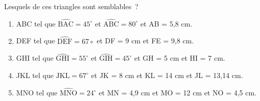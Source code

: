 \documentclass[exercice]{thedocument}%
\begin{document}
%
Lesquels de ces triangles sont semblables~?
\begin{enumerate}
    \item ABC tel que $\widehat{\text{BAC}}=45^\circ$ et $\widehat{\text{ABC}}=80^\circ$ et AB = 5,8 cm.
    \item DEF tel que $\widehat{\text{DEF}}=67\circ$ et DF = 9 cm et FE = 9,8 cm.
    \item GHI tel que $\widehat{\text{GHI}}=55^\circ$ et $\widehat{\text{GIH}}=45^\circ$ et GH = 5 cm et HI = 7 cm.
    \item JKL tel que $\widehat{\text{JKL}}=67^\circ$ et JK = 8 cm et KL = 14 cm et JL = 13,14 cm.
    \item MNO tel que $\widehat{\text{MNO}}=24^\circ$ et MN = 4,9 cm et MO = 12 cm et NO = 4,5 cm.
\end{enumerate}
\end{document}
